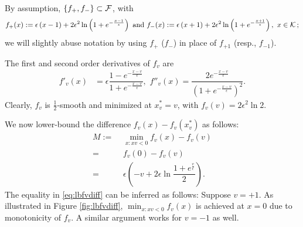 
By assumption,  $\{f_+, f_-\}\subset \mathcal{F}$, with 
\begin{align*}
f_+(x) :=  \epsilon\left( x-1\right)+2\epsilon^2 \ln\left(1+e^{-\frac{x-1}{\epsilon}}  \right)
\text{ and } f_-(x) := \epsilon\left( x+1\right)+2\epsilon^2 \ln\left(1+e^{-\frac{x+1}{\epsilon}}  \right), \,\, x \in \mathcal{K}\,;
\end{align*}
we will slightly abuse notation by using $f_+$ ($f_-$) in place of $f_{+1}$ (resp., $f_{-1}$).

The first and second order derivatives of $f_v$ are
\begin{align*}
f'_v(x) &=\epsilon \dfrac{1-e^{-\frac{x-v}{\epsilon}}}{1+e^{-\frac{x-v}{\epsilon}}} ,\,\,
f''_v(x) = \dfrac{2e^{-\frac{x-v}{\epsilon}} }{\left(  1+e^{-\frac{x-v}{\epsilon}}\right)^2}  .
\end{align*}
Clearly, $f_v$ is $\frac{1}{2}$-smooth and minimized at $x^*_v = v$, with $f_v(v) = 2 \epsilon^2 \ln 2$.

We now lower-bound the difference $f_v(x)-f_v(x_v^*)$ as follows:
\begin{align}
M:=&\,\, \min_{x:xv<0} f_v(x) - f_v(v) \label{eq:lbfvdiffM}\\
 = & \,\, f_v(0) - f_v(v) \label{eq:lbfvdiff}\\
= &\,\, \epsilon\left(-v + 2\epsilon\ln\dfrac{1+e^{\frac{v}{\epsilon}}}{2}\right).\label{eq:lbfvdiff2}
\end{align}
The equality in \eqref{eq:lbfvdiff} can be inferred as follows: Suppose $v=+1$. As illustrated in Figure \ref{fig:lbfvdiff}, $\min_{x:xv<0} f_v(x)$ is achieved at $x=0$ due to monotonicity of $f_v$. A similar argument works for $v=-1$ as well. 

